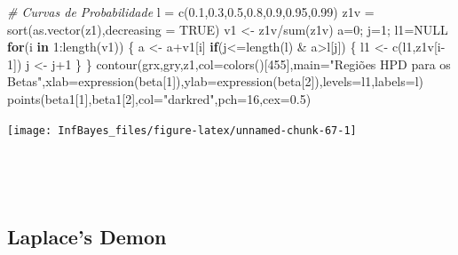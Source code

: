 \documentclass[
]{book}
\newenvironment{Shaded}{\begin{snugshade}}{\end{snugshade}}
\newcommand{\AttributeTok}[1]{\textcolor[rgb]{0.77,0.63,0.00}{#1}}
\newcommand{\CommentTok}[1]{\textcolor[rgb]{0.56,0.35,0.01}{\textit{#1}}}
\newcommand{\ConstantTok}[1]{\textcolor[rgb]{0.00,0.00,0.00}{#1}}
\newcommand{\ControlFlowTok}[1]{\textcolor[rgb]{0.13,0.29,0.53}{\textbf{#1}}}
\newcommand{\DecValTok}[1]{\textcolor[rgb]{0.00,0.00,0.81}{#1}}
\newcommand{\FloatTok}[1]{\textcolor[rgb]{0.00,0.00,0.81}{#1}}
\newcommand{\FunctionTok}[1]{\textcolor[rgb]{0.00,0.00,0.00}{#1}}
\newcommand{\NormalTok}[1]{#1}
\newcommand{\OtherTok}[1]{\textcolor[rgb]{0.56,0.35,0.01}{#1}}
\newcommand{\SpecialCharTok}[1]{\textcolor[rgb]{0.00,0.00,0.00}{#1}}
\newcommand{\StringTok}[1]{\textcolor[rgb]{0.31,0.60,0.02}{#1}}
\begin{document}
\begin{Shaded}
\begin{Highlighting}[]
\CommentTok{\# Curvas de Probabilidade}
\NormalTok{l }\OtherTok{=} \FunctionTok{c}\NormalTok{(}\FloatTok{0.1}\NormalTok{,}\FloatTok{0.3}\NormalTok{,}\FloatTok{0.5}\NormalTok{,}\FloatTok{0.8}\NormalTok{,}\FloatTok{0.9}\NormalTok{,}\FloatTok{0.95}\NormalTok{,}\FloatTok{0.99}\NormalTok{)}
\NormalTok{z1v }\OtherTok{=} \FunctionTok{sort}\NormalTok{(}\FunctionTok{as.vector}\NormalTok{(z1),}\AttributeTok{decreasing =} \ConstantTok{TRUE}\NormalTok{)}
\NormalTok{v1 }\OtherTok{\textless{}{-}}\NormalTok{ z1v}\SpecialCharTok{/}\FunctionTok{sum}\NormalTok{(z1v)}
\NormalTok{a}\OtherTok{=}\DecValTok{0}\NormalTok{; j}\OtherTok{=}\DecValTok{1}\NormalTok{; l1}\OtherTok{=}\ConstantTok{NULL}
\ControlFlowTok{for}\NormalTok{(i }\ControlFlowTok{in} \DecValTok{1}\SpecialCharTok{:}\FunctionTok{length}\NormalTok{(v1)) \{}
\NormalTok{  a }\OtherTok{\textless{}{-}}\NormalTok{ a}\SpecialCharTok{+}\NormalTok{v1[i]}
  \ControlFlowTok{if}\NormalTok{(j}\SpecialCharTok{\textless{}=}\FunctionTok{length}\NormalTok{(l) }\SpecialCharTok{\&}\NormalTok{ a}\SpecialCharTok{\textgreater{}}\NormalTok{l[j]) \{}
\NormalTok{    l1 }\OtherTok{\textless{}{-}} \FunctionTok{c}\NormalTok{(l1,z1v[i}\DecValTok{{-}1}\NormalTok{])}
\NormalTok{    j }\OtherTok{\textless{}{-}}\NormalTok{ j}\SpecialCharTok{+}\DecValTok{1}
\NormalTok{  \}}
\NormalTok{\}}
\FunctionTok{contour}\NormalTok{(grx,gry,z1,}\AttributeTok{col=}\FunctionTok{colors}\NormalTok{()[}\DecValTok{455}\NormalTok{],}\AttributeTok{main=}\StringTok{"Regiões HPD para os Betas"}\NormalTok{,}\AttributeTok{xlab=}\FunctionTok{expression}\NormalTok{(beta[}\DecValTok{1}\NormalTok{]),}\AttributeTok{ylab=}\FunctionTok{expression}\NormalTok{(beta[}\DecValTok{2}\NormalTok{]),}\AttributeTok{levels=}\NormalTok{l1,}\AttributeTok{labels=}\NormalTok{l)}
\FunctionTok{points}\NormalTok{(beta1[}\DecValTok{1}\NormalTok{],beta1[}\DecValTok{2}\NormalTok{],}\AttributeTok{col=}\StringTok{"darkred"}\NormalTok{,}\AttributeTok{pch=}\DecValTok{16}\NormalTok{,}\AttributeTok{cex=}\FloatTok{0.5}\NormalTok{)}
\end{Highlighting}
\end{Shaded}

\begin{center}\texttt{[image: InfBayes\_files/figure-latex/unnamed-chunk-67-1]} \end{center}

\(~\)

\(~\)

\hypertarget{laplaces-demon}{%
\subsection{Laplace's Demon}\label{laplaces-demon}}
\end{document}
